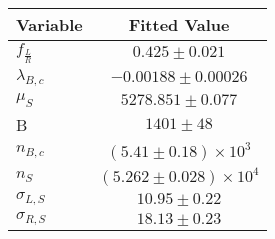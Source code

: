 \begin{tabular}[t]{lc}
\hline
Variable &Fitted Value\\
\hline\hline
$f_{\frac{L}{R}}$&$0.425\pm0.021$\\
\hline
$\lambda_{B,c}$&$-0.00188\pm0.00026$\\
\hline
$\mu_S$&$5278.851\pm0.077$\\
\hline
B&$1401\pm48$\\
\hline
$n_{B,c}$&$(5.41\pm0.18)\times 10^3$\\
\hline
$n_S$&$(5.262\pm0.028)\times 10^4$\\
\hline
$\sigma_{L, S}$&$10.95\pm0.22$\\
\hline
$\sigma_{R, S}$&$18.13\pm0.23$\\
\hline
\end{tabular}